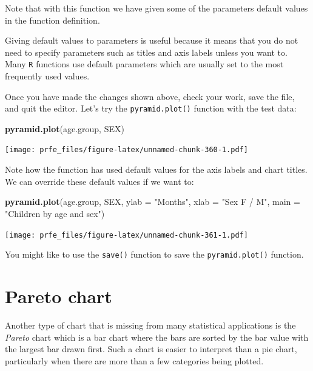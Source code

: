 \documentclass[12pt,a4paper]{book}
\newenvironment{Shaded}{\begin{snugshade}}{\end{snugshade}}
\newcommand{\KeywordTok}[1]{\textcolor[rgb]{0.13,0.29,0.53}{\textbf{#1}}}
\newcommand{\DataTypeTok}[1]{\textcolor[rgb]{0.13,0.29,0.53}{#1}}
\newcommand{\StringTok}[1]{\textcolor[rgb]{0.31,0.60,0.02}{#1}}
\newcommand{\NormalTok}[1]{#1}
\theoremstyle{definition}
\theoremstyle{definition}
\theoremstyle{definition}
\theoremstyle{remark}
\begin{document}
Note that with this function we have given some of the parameters
default values in the function definition.

Giving default values to parameters is useful because it means that you
do not need to specify parameters such as titles and axis labels unless
you want to. Many \texttt{R} functions use default parameters which are
usually set to the most frequently used values.

Once you have made the changes shown above, check your work, save the
file, and quit the editor. Let's try the \texttt{pyramid.plot()}
function with the test data:

\begin{Shaded}
\begin{Highlighting}[]
\KeywordTok{pyramid.plot}\NormalTok{(age.group, SEX)}
\end{Highlighting}
\end{Shaded}

\texttt{[image: prfe\_files/figure-latex/unnamed-chunk-360-1.pdf]}

Note how the function has used default values for the axis labels and
chart titles. We can override these default values if we want to:

\begin{Shaded}
\begin{Highlighting}[]
\KeywordTok{pyramid.plot}\NormalTok{(age.group, SEX, }\DataTypeTok{ylab =} \StringTok{"Months"}\NormalTok{, }\DataTypeTok{xlab =} \StringTok{"Sex F / M"}\NormalTok{,}
             \DataTypeTok{main =} \StringTok{"Children by age and sex"}\NormalTok{)}
\end{Highlighting}
\end{Shaded}

\texttt{[image: prfe\_files/figure-latex/unnamed-chunk-361-1.pdf]}

You might like to use the \texttt{save()} function to save the
\texttt{pyramid.plot()} function.

\hypertarget{pareto-chart}{%
\section{Pareto chart}\label{pareto-chart}}

Another type of chart that is missing from many statistical applications
is the \emph{Pareto} chart which is a bar chart where the bars are
sorted by the bar value with the largest bar drawn first. Such a chart
is easier to interpret than a pie chart, particularly when there are
more than a few categories being plotted.
\end{document}
